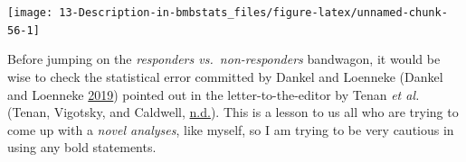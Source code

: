 \documentclass[
]{book}
\newenvironment{Shaded}{\begin{snugshade}}{\end{snugshade}}
\newcommand{\CommentTok}[1]{\textcolor[rgb]{0.56,0.35,0.01}{\textit{#1}}}
\newcommand{\DataTypeTok}[1]{\textcolor[rgb]{0.13,0.29,0.53}{#1}}
\newcommand{\DecValTok}[1]{\textcolor[rgb]{0.00,0.00,0.81}{#1}}
\newcommand{\FloatTok}[1]{\textcolor[rgb]{0.00,0.00,0.81}{#1}}
\newcommand{\KeywordTok}[1]{\textcolor[rgb]{0.13,0.29,0.53}{\textbf{#1}}}
\newcommand{\NormalTok}[1]{#1}
\newcommand{\OperatorTok}[1]{\textcolor[rgb]{0.81,0.36,0.00}{\textbf{#1}}}
\newcommand{\OtherTok}[1]{\textcolor[rgb]{0.56,0.35,0.01}{#1}}
\newcommand{\StringTok}[1]{\textcolor[rgb]{0.31,0.60,0.02}{#1}}
\begin{document}
\begin{Shaded}
\end{Shaded}

\begin{center}\texttt{[image: 13-Description-in-bmbstats\_files/figure-latex/unnamed-chunk-56-1]} \end{center}

Before jumping on the \emph{responders vs.~non-responders} bandwagon, it would be wise to check the statistical error committed by Dankel and Loenneke (Dankel and Loenneke \protect\hyperlink{ref-dankelMethodStopAnalyzing2019}{2019}) pointed out in the letter-to-the-editor by Tenan \emph{et al.} (Tenan, Vigotsky, and Caldwell, \protect\hyperlink{ref-tenanStatisticalPropertiesDankelLoenneke}{n.d.}). This is a lesson to us all who are trying to come up with a \emph{novel analyses}, like myself, so I am trying to be very cautious in using any bold statements.
\end{document}
